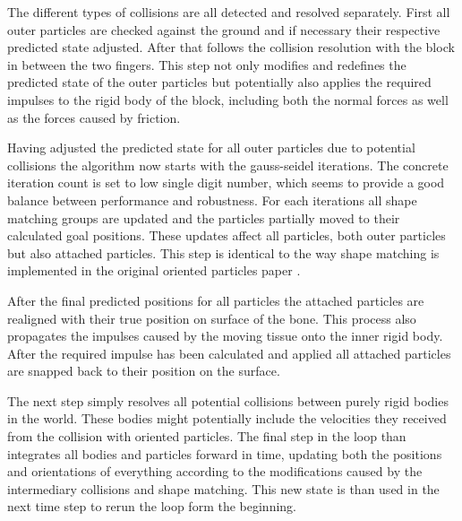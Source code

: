 The different types of collisions are all detected and resolved separately. First all outer particles are checked against the ground and if necessary their respective predicted state adjusted. After that follows the collision resolution with the block in between the two fingers. This step not only modifies and redefines the predicted state of the outer particles but potentially also applies the required impulses to the rigid body of the block, including both the normal forces as well as the forces caused by friction.

Having adjusted the predicted state for all outer particles due to potential collisions the algorithm now starts with the gauss-seidel iterations. The concrete iteration count is set to low single digit number, which seems to provide a good balance between performance and robustness. For each iterations all shape matching groups are updated and the particles partially moved to their calculated goal positions. These updates affect all particles, both outer particles but also attached particles. This step is identical to the way shape matching is implemented in the original oriented particles paper \cite{Muller:2011gn}.

After the final predicted positions for all particles the attached particles are realigned with their true position on surface of the bone. This process also propagates the impulses caused by the moving tissue onto the inner rigid body. After the required impulse has been calculated and applied all attached particles are snapped back to their position on the surface.

The next step simply resolves all potential collisions between purely rigid bodies in the world. These bodies might potentially include the velocities they received from the collision with oriented particles. The final step in the loop than integrates all bodies and particles forward in time, updating both the positions and orientations of everything according to the modifications caused by the intermediary collisions and shape matching. This new state is than used in the next time step to rerun the loop form the beginning.